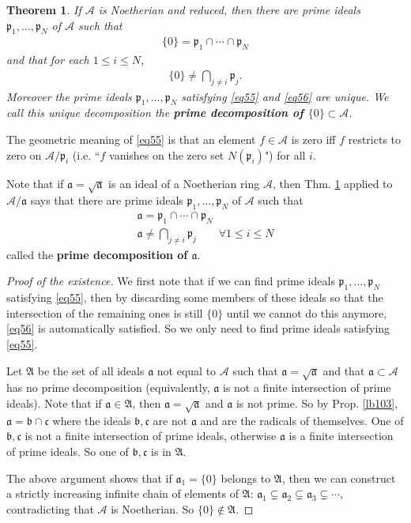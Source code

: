 \documentclass[12pt,b5paper,notitlepage]{report}
\theoremstyle{definition}
\theoremstyle{plain}
\newtheorem{thm}[df]{Theorem}
\newcommand{\fk}{\mathfrak}
\newcommand{\mc}{\mathcal}
\newcommand{\pk}{\mathfrak p}
\numberwithin{equation}{section}
\begin{document}
\begin{thm}\label{lb102}
If $\mc A$ is Noetherian and reduced, then there are prime ideals $\fk p_1,\dots,\fk p_N$ of $\mc A$ such that
\begin{align}
\{0\}=\fk p_1\cap\cdots\cap \fk p_N\label{eq55}
\end{align}
and that for each $1\leq i\leq N$,
\begin{align}
\{0\}\neq \bigcap_{j\neq i}\fk p_j.\label{eq56}
\end{align}
Moreover the prime ideals $\pk_1,\dots,\pk_N$ satisfying \eqref{eq55} and \eqref{eq56} are unique. We call this unique decomposition the \textbf{prime decomposition of $\{0\}\subset\mc A$}. 
\end{thm}

The geometric meaning of \eqref{eq55} is that an element $f\in \mc A$ is zero iff $f$ restricts to zero on $\mc A/\pk_i$ (i.e. ``$f$ vanishes on the zero set $N(\pk_i)$") for all $i$.

Note that if $\fk a=\sqrt{\fk a}$ is an ideal of a Noetherian ring $\mc A$, then Thm. \ref{lb102} applied to $\mc A/\fk a$ says that there are prime ideals $\pk_1,\dots,\pk_N$ of $\mc A$ such that
\begin{subequations}\label{eq72}
\begin{gather}
\fk a=\pk_1\cap\cdots\cap\pk_N\\
\fk a\neq \bigcap_{j\neq i}\fk p_j\qquad\forall 1\leq i\leq N
\end{gather}
\end{subequations}
called the \textbf{prime decomposition of $\fk a$}.


\begin{proof}[Proof of the existence]
We first note that if we can find prime ideals $\pk_1,\dots,\pk_N$ satisfying \eqref{eq55}, then by discarding some members of these ideals so that the intersection of the remaining ones is still $\{0\}$ until we cannot do this anymore, \eqref{eq56} is automatically satisfied. So we only need to find prime ideals satisfying \eqref{eq55}.

Let $\fk A$ be the set of all ideals $\fk a$ not equal to $\mc A$ such that $\fk a=\sqrt{\fk a}$ and that $\fk a\subset\mc A$ has no prime decomposition (equivalently, $\fk a$ is not a finite intersection of prime ideals). Note that if $\fk a\in\fk A$, then $\fk a=\sqrt{\fk a}$ and $\fk a$ is not prime. So by Prop. \ref{lb103}, $\fk a=\fk b\cap \fk c$ where the ideals $\fk b,\fk c$ are not $\fk a$ and are the radicals of themselves. One of $\fk b,\fk c$ is not a finite intersection of prime ideals, otherwise $\fk a$ is a finite intersection of prime ideals. So one of $\fk b,\fk c$ is in $\fk A$. 

The above argument shows that if $\fk a_1=\{0\}$ belongs to $\fk A$, then we can construct a strictly increasing infinite chain of elements of $\fk A$: $\fk a_1\subsetneq\fk a_2\subsetneq\fk a_3\subsetneq\cdots$, contradicting that $\mc A$ is Noetherian. So $\{0\}\notin\fk A$.
\end{proof}
\end{document}
